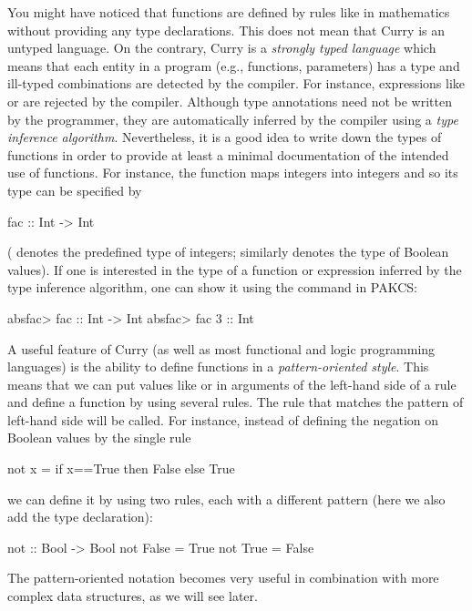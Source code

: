 You might have noticed that functions are defined by rules
like in mathematics without providing any type declarations.
This does not mean that Curry is an untyped language.  On the contrary, Curry is a \emph{strongly typed language}
which means that each entity in a program (e.g., functions, parameters)
has a type and ill-typed combinations are detected
by the compiler. For instance, expressions like
 or  are rejected by the compiler.
Although type annotations need not be written by the programmer,
they are automatically inferred by the compiler
using a \emph{type inference algorithm}.
Nevertheless, it is a good idea to write down the types
of functions in order to provide at least a minimal documentation
of the intended use of functions. For instance,
the function  maps integers into integers and so
its type can be specified by
\begin{prog}
fac :: Int -> Int
\end{prog}
( denotes the predefined type of integers; similarly
 denotes the type of Boolean values).
If one is interested in the type of a function or expression
inferred by the type inference algorithm, one can show it
using the command  in PAKCS:
\begin{prog}
absfac> 
fac :: Int -> Int
absfac> 
fac 3 :: Int
\end{prog}
%
A useful feature of Curry (as well as most functional and logic
programming languages) is the ability to define
functions in a \emph{pattern-oriented style}.
This means that we can put values like  or 
in arguments of the left-hand side of a rule
and define a function by using several rules.  The rule that matches the pattern of left-hand side will be called.   
For instance, instead of defining the negation on Boolean values by
the single rule
\begin{prog}
not x = if x==True then False
                   else True
\end{prog}
we can define it by using two rules, each with a different pattern (here we
also add the type declaration):
\begin{prog}
not :: Bool -> Bool
not False = True
not True  = False
\end{prog}
The pattern-oriented notation becomes very useful in combination
with more complex data structures, as we will see later.

